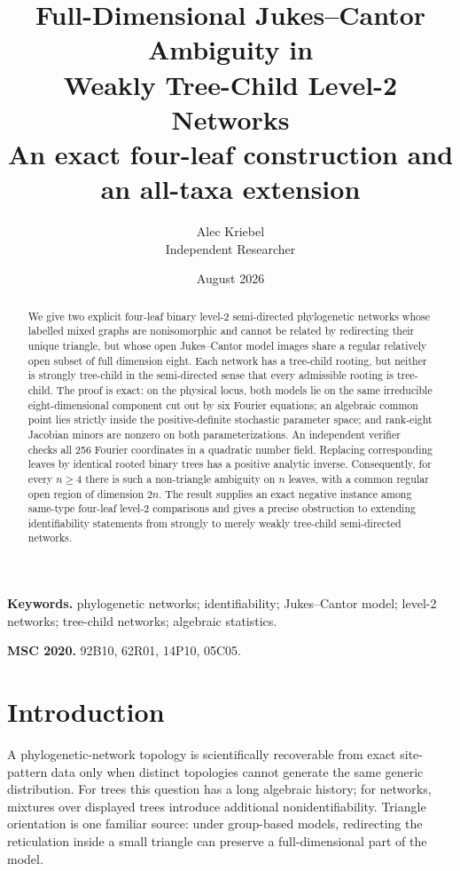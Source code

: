 \documentclass[11pt]{article}
\title{Full-Dimensional Jukes--Cantor Ambiguity in\\
Weakly Tree-Child Level-2 Networks\\
\large An exact four-leaf construction and an all-taxa extension}
\author{Alec Kriebel\\\small Independent Researcher}
\date{August 2026}
\theoremstyle{remark}
\begin{document}
\maketitle

\begin{abstract}
We give two explicit four-leaf binary level-2 semi-directed phylogenetic
networks whose labelled mixed graphs are nonisomorphic and cannot be related
by redirecting their unique triangle, but whose open Jukes--Cantor model
images share a regular relatively open subset of full dimension eight.  Each
network has a tree-child rooting, but neither is strongly tree-child in the
semi-directed sense that every admissible rooting is tree-child.  The proof is
exact: on the physical locus, both models lie on the same irreducible
eight-dimensional component cut out by six Fourier equations; an algebraic
common point lies
strictly inside the positive-definite stochastic parameter space; and
rank-eight Jacobian minors are nonzero on both parameterizations.  An
independent verifier checks all 256 Fourier coordinates in a quadratic number
field.  Replacing corresponding leaves by identical rooted binary trees has
a positive analytic inverse.  Consequently, for every $n\ge4$ there is such
a non-triangle ambiguity on $n$ leaves, with a common regular open region of
dimension $2n$.  The result supplies an exact negative instance among
same-type four-leaf level-2 comparisons and gives a precise obstruction to extending
identifiability statements from strongly to merely weakly tree-child
semi-directed networks.
\end{abstract}

\noindent\textbf{Keywords.} phylogenetic networks; identifiability;
Jukes--Cantor model; level-2 networks; tree-child networks; algebraic
statistics.

\medskip
\noindent\textbf{MSC 2020.} 92B10, 62R01, 14P10, 05C05.

\section{Introduction}

A phylogenetic-network topology is scientifically recoverable from exact
site-pattern data only when distinct topologies cannot generate the same
generic distribution.  For trees this question has a long algebraic history;
for networks, mixtures over displayed trees introduce additional
nonidentifiability.  Triangle orientation is one familiar source: under
group-based models, redirecting the reticulation inside a small triangle can
preserve a full-dimensional part of the model.
\end{document}
